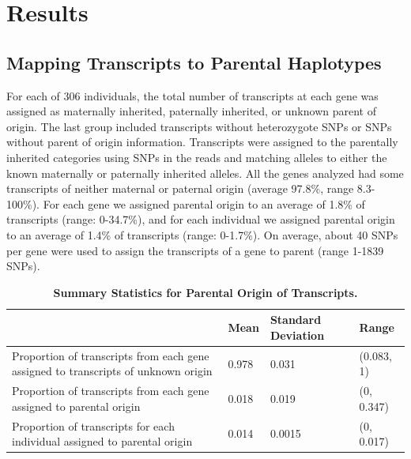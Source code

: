 \section{Results}\label{ch03-results}
\subsection{Mapping Transcripts to Parental Haplotypes}\label{Mapping Transcripts to Parental Haplotypes}
For each of 306 individuals, the total number of transcripts at each gene was assigned as maternally inherited, paternally inherited, or unknown parent of origin. The last group included transcripts without heterozygote SNPs or SNPs without parent of origin information. Transcripts were assigned to the parentally inherited categories using SNPs in the reads and matching alleles to either the known maternally or paternally inherited alleles. All the genes analyzed had some transcripts of neither maternal or paternal origin (average 97.8\%, range 8.3-100\%). For each gene we assigned parental origin to an average of 1.8\% of transcripts (range: 0-34.7\%), and for each individual we assigned parental origin to an average of 1.4\% of transcripts (range: 0-1.7\%). On average, about 40 SNPs per gene were used to assign the transcripts of a gene to parent (range 1-1839 SNPs). 



\begin{table}
\centering
\begin{adjustbox}{width={\textwidth}}
\begin{tabular}{@{}p{10cm}p{2cm}p{4cm}p{2cm}@{}}
\toprule & Mean & Standard Deviation & Range \\ \midrule
 Proportion of transcripts from each gene assigned to transcripts of unknown origin & 0.978 & 0.031 & (0.083, 1) \\
 Proportion of transcripts from each gene assigned to parental origin & 0.018 & 0.019 & (0, 0.347) \\
 Proportion of transcripts for each individual assigned to parental origin & 0.014 & 0.0015 & (0, 0.017) \\ \bottomrule
\end{tabular}
\end{adjustbox}
\caption[Summary Statistics for Parental Origin of Transcripts.]{\textbf{Summary Statistics for Parental Origin of Transcripts.}}
\label{tab:summarystats}
\end{table}




